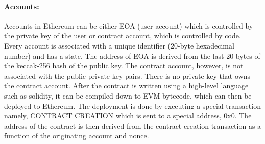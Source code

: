 

\paragraph{Accounts:}Accounts in Ethereum can be either \ac{EOA} (user account)
which is controlled by the private key of the user or contract account, which
is controlled by code. Every account is associated with a unique identifier
(20-byte hexadecimal number) and has a state. The address of \ac{EOA} is
derived from the last 20 bytes of the keccak-256 hash of the public key. The
contract account, however, is not associated with the public-private key pairs.
There is no private key that owns the contract account. After the contract is
written using a high-level language such as solidity, it can be compiled down
to EVM bytecode, which can then be deployed to Ethereum. The deployment is done
by executing a special transaction namely, CONTRACT CREATION which is sent to a
special address, 0x0. The address of the contract is then derived from the
contract creation transaction as a function of the originating account and
nonce. 


